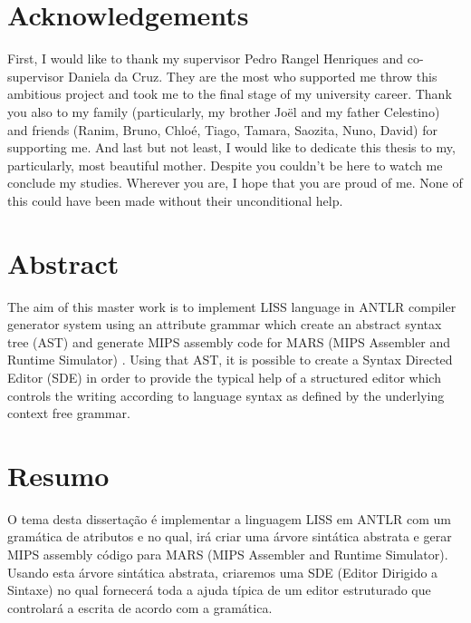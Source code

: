\documentclass[
  oneside,
  11pt, a4paper,
  footinclude=true,
  headinclude=true,
  cleardoublepage=empty
]{scrbook}
\author{Damien da Silva Vaz}
\date{\myear} %
\begin{document}
	\umfrontcover	
	\umtitlepage
	
	\chapter*{Acknowledgements}
	First, I would like to thank my supervisor Pedro Rangel Henriques and co-supervisor Daniela da Cruz. They are the most who supported me throw this ambitious project and took me to the final stage of my university career.\newline
Thank you also to my family (particularly, my brother Joël and my father Celestino) and friends (Ranim, Bruno, Chloé, Tiago, Tamara, Saozita, Nuno, David) for supporting me.\newline
And last but not least, I would like to dedicate this thesis to my, particularly, most beautiful mother.
Despite you couldn't be here to watch me conclude my studies. Wherever you are, I hope that you are proud of me.	
None of this could have been made without their unconditional help.

	\chapter*{Abstract}
	The aim of this master work is to implement LISS language in ANTLR compiler generator system using an attribute grammar which create an abstract syntax tree (AST) and generate MIPS assembly code for MARS (MIPS Assembler and Runtime Simulator) .
Using that AST, it is possible to create a Syntax Directed Editor (SDE) in order to provide the typical help of a structured editor which controls the writing according to language syntax as defined by the underlying context free grammar.
	
	\cleardoublepage
	\chapter*{Resumo}
	O tema desta dissertação é implementar a linguagem LISS em ANTLR com um gramática de atributos e no qual, irá criar uma árvore sintática abstrata e gerar MIPS assembly código para MARS (MIPS Assembler and Runtime Simulator).
        Usando esta árvore sintática abstrata, criaremos uma SDE (Editor Dirigido a Sintaxe) no qual fornecerá toda a ajuda típica de um editor estruturado que controlará a escrita de acordo com a gramática.	
	
\end{document}
